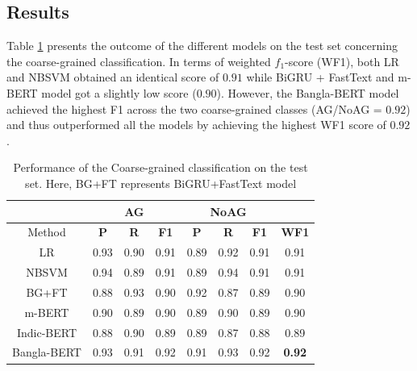 \documentclass[11pt]{article}
\begin{document}

\subsection{Results}
Table \ref{cg}  presents the outcome of the different models on the test set concerning the coarse-grained classification. In terms of weighted $f_1$-score (WF1), both LR and NBSVM obtained an identical score of $0.91$ while BiGRU + FastText and m-BERT model got a slightly low score ($0.90$). However, the Bangla-BERT model achieved the highest F1 across the two coarse-grained classes (AG/NoAG = $0.92$) and thus outperformed all the models by achieving the highest WF1 score of $0.92$. 

\begin{table}[h!]
\centering
\scriptsize
\begin{tabular}{cccc|ccc|c}

 & \multicolumn{3}{c}{\textbf{AG}}& \multicolumn{3}{c}{\textbf{NoAG}}\\
\hline
Method &\textbf{P}&\textbf{R}&\textbf{F1}&\textbf{P}&\textbf{R}&\textbf{F1}&\textbf{WF1}\\
\hline
LR & 0.93 & 0.90 & 0.91 & 0.89 & 0.92 & 0.91 & 0.91  \\

NBSVM & 0.94 & 0.89 & 0.91 & 0.89 & 0.94 & 0.91 & 0.91 \\

BG+FT &  0.88 & 0.93 & 0.90 & 0.92 & 0.87 & 0.89 & 0.90  \\

m-BERT & 0.90 & 0.89 & 0.90 & 0.89 & 0.90 & 0.89 & 0.90 \\

Indic-BERT & 0.88 & 0.90 & 0.89 & 0.89 & 0.87 & 0.88 & 0.89  \\

Bangla-BERT &  0.93 & 0.91 & 0.92 & 0.91 & 0.93 & 0.92 & \textbf{0.92} \\
\hline            
\end{tabular}
\caption{\label{cg}{Performance of the Coarse-grained classification on the test set. Here, BG+FT represents BiGRU+FastText model}}
\end{table}
\end{document}
